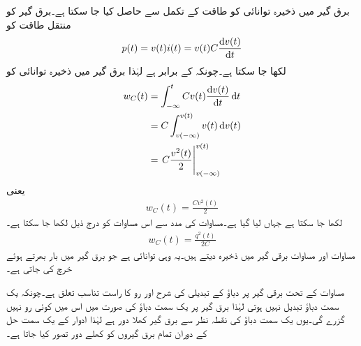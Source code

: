 برق گیر میں ذخیرہ توانائی  کو طاقت کے تکمل سے حاصل کیا جا سکتا ہے۔برق گیر کو منتقل طاقت  کو
\begin{align}\label{مساوات_امالہ_طاقت_برق_گیر}
p(t)=v(t)i(t)=v(t) C \frac{\dif v(t)}{\dif t}
\end{align}
لکھا جا سکتا ہے۔چونکہ  کے برابر ہے  لہٰذا برق گیر میں ذخیرہ توانائی کو
\begin{align*}
w_C(t)&=\int_{-\infty}^{t} C v(t) \frac{\dif v(t)}{\dif t} \dif t\\
&=C\int_{v(-\infty)}^{v(t)} v(t) \dif v(t)\\
&=\left. C \frac{v^2(t)}{2} \right|_{v(-\infty)}^{v(t)}
\end{align*}
یعنی
\begin{align}\label{مساوات_امالہ_توانائی_برق_گیر_الف}
w_C(t)=\frac{C v^2(t)}{2}
\end{align}
لکھا جا سکتا ہے جہاں  لیا گیا ہے۔مساوات  کی مدد سے اس مساوات کو درج ذیل لکھا جا سکتا ہے۔
\begin{align}\label{مسوات_امالہ_توانائی_برق_گیر_ب}
w_C(t)=\frac{q^2(t)}{2C}
\end{align}
مساوات  اور مساوات  برقی گیر میں ذخیرہ  دیتے ہیں۔یہ وہی توانائی ہے جو برق گیر میں بار بھرتے ہوئے خرچ کی جاتی ہے۔

مساوات  کے تحت برقی گیر پر دباؤ کے تبدیلی کی شرح اور رو کا راست تناسب تعلق ہے۔چونکہ یک سمت دباؤ تبدیل نہیں ہوتی لہٰذا برق گیر پر یک سمت دباؤ کی صورت میں اس میں کوئی رو نہیں گزرے گی۔یوں یک سمت دباؤ کی نقطہ نظر سے برق گیر کھلا دور ہے لہٰذا ادوار کے یک سمت حل کے دوران تمام برق گیروں کو کھلے دور تصور کیا جاتا ہے۔

